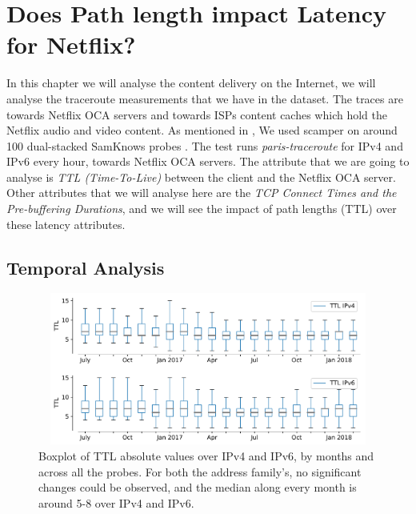 \hypersetup{linkcolor=blue}
\chapter{Does Path length impact Latency for Netflix?} \label{chapter:7}
In this chapter we will analyse the content delivery on the Internet, we will analyse the traceroute measurements that we have in the dataset. 
The traces are towards Netflix OCA servers and towards ISPs content caches which hold the Netflix audio and video content. As mentioned in \cite{vietpam2018}, 
We used scamper \cite{scamper} on around 100 dual-stacked SamKnows probes \cite{samknows}. The test runs \textit{paris-traceroute} \cite{paris} for IPv4 and IPv6 
every hour, towards Netflix OCA servers. The attribute that we are going to analyse is \textit{TTL (Time-To-Live)} \cite{rfc3443} between the client and the Netflix OCA server. 
Other attributes that we will analyse here are the \textit{TCP Connect Times and the Pre-buffering Durations}, and we will see the impact of path lengths (TTL) over these 
latency attributes. 

\section{Temporal Analysis}

\begin{figure}[!ht]
	\centering
	\includegraphics[keepaspectratio, height=5cm, width=15cm]{figures/traceroute/netflix-traceroute-rtt-ttl-separate-new.pdf}
	\caption[TTL Boxplot Absolute]{Boxplot of TTL absolute values over IPv4 and IPv6, by months and across all the probes. For both the address family's, no significant changes could be observed, and the median along every month is around 5-8 over IPv4 and IPv6.}
	\label{fig:TTL Boxplot Absolute}
\end{figure}

